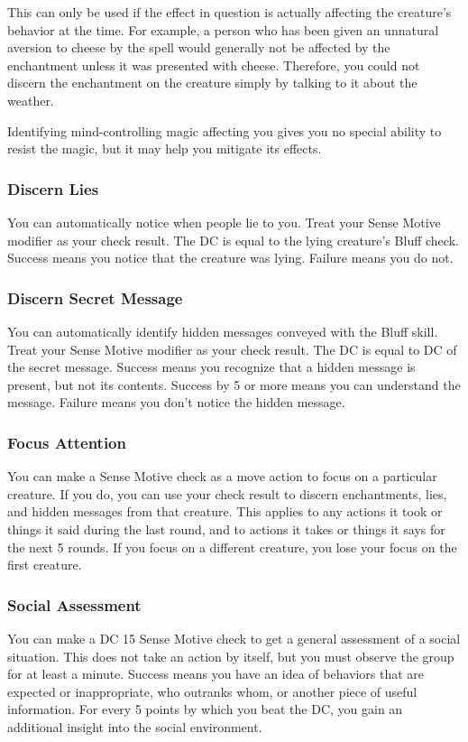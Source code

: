 This can only be used if the effect in question is actually affecting the creature's behavior at the time. For example, a person who has been given an unnatural aversion to cheese by the  spell would generally not be affected by the enchantment unless it was presented with cheese. Therefore, you could not discern the enchantment on the creature simply by talking to it about the weather. 

Identifying mind-controlling magic affecting you gives you no special ability to resist the magic, but it may help you mitigate its effects.

\subsubsection{Discern Lies}
You can automatically notice when people lie to you. Treat your Sense Motive modifier as your check result. The DC is equal to the lying creature's Bluff check. Success means you notice that the creature was lying. Failure means you do not.

\subsubsection{Discern Secret Message}
You can automatically identify hidden messages conveyed with the Bluff skill. Treat your Sense Motive modifier as your check result. The DC is equal to DC of the secret message. Success means you recognize that a hidden message is present, but not its contents. Success by 5 or more means you can understand the message. Failure means you don't notice the hidden message.

\subsubsection{Focus Attention}
You can make a Sense Motive check as a move action to focus on a particular creature. If you do, you can use your check result to discern enchantments, lies, and hidden messages from that creature. This applies to any actions it took or things it said during the last round, and to actions it takes or things it says for the next 5 rounds. If you focus on a different creature, you lose your focus on the first creature.

\subsubsection{Social Assessment}
You can make a DC 15 Sense Motive check to get a general assessment of a social situation. This does not take an action by itself, but you must observe the group for at least a minute. Success means you have an idea of behaviors that are expected or inappropriate, who outranks whom, or another piece of useful information. For every 5 points by which you beat the DC, you gain an additional insight into the social environment.

